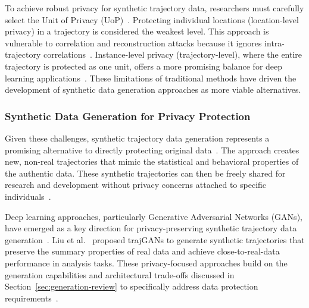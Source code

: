 \documentclass[runningheads]{llncs}
\begin{document}
To achieve robust privacy for synthetic trajectory data, researchers must carefully select the Unit of Privacy (UoP)~\cite{buchholzSystematisationKnowledgeTrajectory2024,primaultLongRoadComputational2019}. Protecting individual locations (location-level privacy) in a trajectory is considered the weakest level. This approach is vulnerable to correlation and reconstruction attacks because it ignores intra-trajectory correlations~\cite{buchholzSystematisationKnowledgeTrajectory2024,buchholzReconstructionAttackDifferential2022,primaultDifferentiallyPrivateLocation2014,erroundaAnalysisDifferentialPrivacy2019}. Instance-level privacy (trajectory-level), where the entire trajectory is protected as one unit, offers a more promising balance for deep learning applications~\cite{buchholzSystematisationKnowledgeTrajectory2024}. These limitations of traditional methods have driven the development of synthetic data generation approaches as more viable alternatives.

\subsubsection{Synthetic Data Generation for Privacy Protection}

Given these challenges, synthetic trajectory data generation represents a promising alternative to directly protecting original data~\cite{buchholzSystematisationKnowledgeTrajectory2024,raoLSTMTrajGANDeepLearning2020a,liuTrajGANsUsingGenerative2018}. The approach creates new, non-real trajectories that mimic the statistical and behavioral properties of the authentic data. These synthetic trajectories can then be freely shared for research and development without privacy concerns attached to specific individuals~\cite{raoLSTMTrajGANDeepLearning2020a,liuTrajGANsUsingGenerative2018,quGenerativeAdversarialNetworks2020}.

Deep learning approaches, particularly Generative Adversarial Networks (GANs), have emerged as a key direction for privacy-preserving synthetic trajectory data generation~\cite{buchholzSystematisationKnowledgeTrajectory2024,liuTrajGANsUsingGenerative2018,raoLSTMTrajGANDeepLearning2020a,quGenerativeAdversarialNetworks2020}. Liu et al.~\cite{liuTrajGANsUsingGenerative2018} proposed trajGANs to generate synthetic trajectories that preserve the summary properties of real data and achieve close-to-real-data performance in analysis tasks. These privacy-focused approaches build on the generation capabilities and architectural trade-offs discussed in Section~\ref{sec:generation-review} to specifically address data protection requirements~\cite{raoLSTMTrajGANDeepLearning2020a,quGenerativeAdversarialNetworks2020,buchholzSystematisationKnowledgeTrajectory2024,ponomarevaHowDPfyML2023}.
\end{document}
